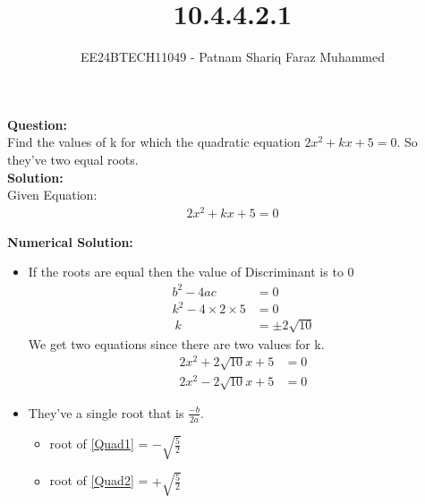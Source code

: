 \documentclass[journal]{IEEEtran}
\numberwithin{equation}{enumi}
\numberwithin{figure}{enumi}
\begin{document}


\title{10.4.4.2.1}
\author{EE24BTECH11049 - Patnam Shariq Faraz Muhammed}

{\let\newpage\relax\maketitle}

\textbf{Question:}\\

Find the values of k for which the quadratic equation $2x^2 + kx + 5 = 0$. So they've two equal roots.\\

\textbf{Solution:}\\

Given Equation:
\begin{align}
    2x^2 + kx + 5 = 0
\end{align}

\textbf{Numerical Solution:}
\begin{itemize}
    \item If the roots are equal then the value of Discriminant is to $0$
        \begin{align}
            b^2 - 4ac &= 0\\
            k^2 - 4 \times 2 \times 5 &= 0\\\
            k &= \pm 2\sqrt{10}
        \end{align}
        We get two equations since there are two values for k.
        \begin{align}
            2x^2 + 2\sqrt{10}x + 5 &= 0 \label{Quad1}\\
            2x^2 - 2\sqrt{10}x + 5 &= 0 \label{Quad2}
        \end{align}
    \item They've a single root that is $\frac{-b}{2a}$.\\
        \begin{itemize}
            \item root of \eqref{Quad1} = $-\sqrt{\frac{5}{2}}$\\
            \item root of \eqref{Quad2} = $+\sqrt{\frac{5}{2}}$\\
        \end{itemize}
\end{itemize}
\end{document}
